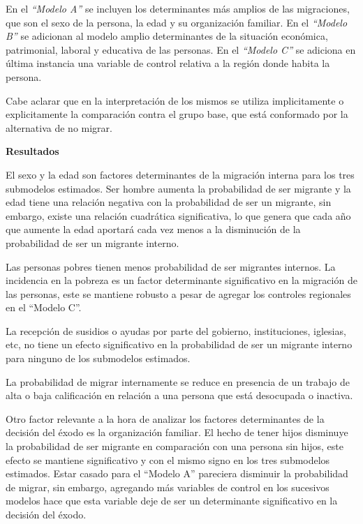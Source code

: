 \documentclass[12pt,a4paper]{article}
\begin{document}
En el \textit{``Modelo A''} se incluyen los determinantes más amplios de las migraciones, que son el sexo de la persona, la edad y su organización familiar.
En el \textit{``Modelo B''} se adicionan al modelo amplio determinantes de la situación económica, patrimonial, laboral y educativa de las personas.
En el \textit{``Modelo C''} se adiciona en última instancia una variable de control relativa a la región donde habita la persona.

Cabe aclarar que en la interpretación de los mismos se utiliza implicitamente o explicitamente la comparación contra el grupo base, que está conformado por la alternativa de no migrar.

\textbf{Resultados}

El sexo y la edad son factores determinantes de la migración interna para los tres submodelos estimados. Ser hombre aumenta la probabilidad de ser migrante y la edad tiene una relación negativa con la probabilidad de ser un migrante, sin embargo, existe una relación cuadrática significativa, lo que genera que cada año que aumente la edad aportará cada vez menos a la disminución de  la probabilidad de ser un migrante interno.

Las personas pobres tienen menos probabilidad de ser migrantes internos. La incidencia en la pobreza es un factor determinante significativo en la migración de las personas, este se mantiene robusto a pesar de agregar los controles regionales en el ``Modelo C''. 

La recepción de susidios o ayudas por parte del gobierno, instituciones, iglesias, etc, no tiene un efecto significativo en la probabilidad de ser un migrante interno para ninguno de los submodelos estimados. 

La probabilidad de migrar internamente se reduce en presencia de un trabajo de alta o baja calificación en relación a una persona que está desocupada o inactiva.

Otro factor relevante a la hora de analizar los factores determinantes de la decisión del éxodo es la organización familiar. El hecho de tener hijos disminuye la probabilidad de ser migrante en comparación con una persona sin hijos, este efecto se mantiene significativo y con el mismo signo en los tres submodelos estimados. Estar casado para el ``Modelo A'' pareciera disminuir la probabilidad de migrar, sin embargo, agregando más variables de control en los sucesivos modelos hace que esta variable deje de ser un determinante significativo en la decisión del éxodo.
\end{document}
